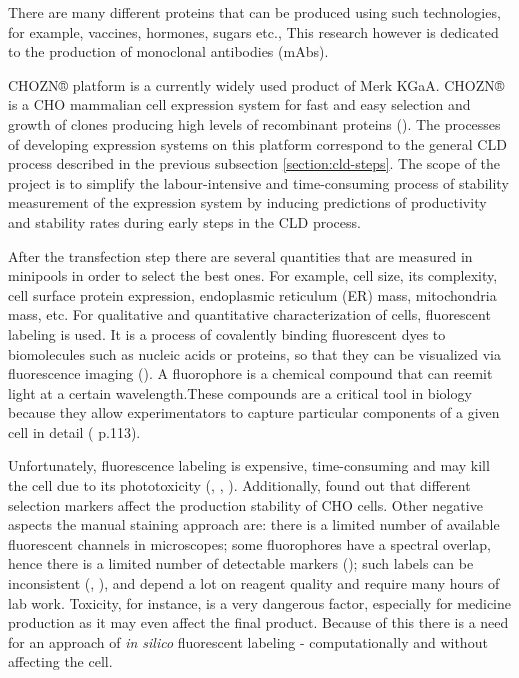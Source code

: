 There are many different proteins that can be produced using such technologies, for example, vaccines, hormones, sugars etc., This research however is dedicated to the production of monoclonal antibodies (mAbs). 

CHOZN® platform is a currently widely used product of Merk KGaA. CHOZN® is a CHO mammalian cell expression system for fast and easy selection and growth of clones producing high levels of recombinant proteins (\cite{chozn}). The processes of developing expression systems on this platform correspond to the general CLD process described in the previous subsection \ref{section:cld-steps}. The scope of the project is to simplify the labour-intensive and time-consuming process of stability measurement of the expression system by inducing predictions of productivity and stability rates during early steps in the CLD process. 

After the transfection step there are several quantities that are measured in minipools in order to select the best ones. For example, cell size, its complexity, cell surface protein expression, endoplasmic reticulum (ER) mass, mitochondria mass, etc. For qualitative and quantitative characterization of cells, fluorescent labeling is used. It is a process of covalently binding fluorescent dyes to biomolecules such as nucleic acids or proteins, so that they can be visualized via fluorescence imaging (\cite{fluorescent_labeling}). A fluorophore is a chemical compound that can reemit light at a certain wavelength.These compounds are a critical tool in biology because they allow experimentators to capture particular components of a given cell in detail (\cite{DL_for_LS} p.113).

Unfortunately, fluorescence labeling is expensive, time-consuming and may kill the cell due to its phototoxicity (\cite{Fried_1982}, \cite{Patil_2018}, \cite{Progatzky_2013}). Additionally, \cite{Yeo_2017} found out that different selection markers affect the production stability of CHO cells. Other negative aspects  the manual staining approach are: there is a limited number of available fluorescent channels in microscopes; some fluorophores have a spectral overlap, hence there is a limited number of detectable markers (\cite{Perfetto_2004}); such labels can be inconsistent (\cite{Burry_2011}, \cite{Weigert_1970}), and depend a lot on reagent quality and require many hours of lab work. Toxicity, for instance, is a very dangerous factor, especially for medicine production as it may even affect the final product. Because of this there is a need for an approach of \textit{in silico} fluorescent labeling - computationally and without affecting the cell. 

